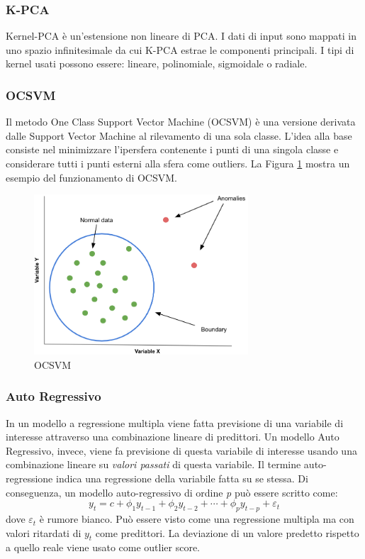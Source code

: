 \subsubsection{K-PCA}
Kernel-PCA \cite{hoffmann2007kernel} è un'estensione non lineare di PCA. I dati di input sono mappati in uno spazio infinitesimale da cui K-PCA estrae le componenti principali. I tipi di kernel usati possono essere: lineare, polinomiale, sigmoidale o radiale.

\subsubsection{OCSVM}
Il metodo One Class Support Vector Machine (OCSVM) \cite{scholkopf2001estimating} è una versione derivata dalle Support Vector Machine al rilevamento di una sola classe. L'idea alla base consiste nel minimizzare l'ipersfera contenente i punti di una singola classe e considerare tutti i punti esterni alla sfera come outliers.
La Figura \ref{ocsvm} mostra un esempio del funzionamento di OCSVM.
\begin{figure}[t]
	\centering
	\includegraphics[width=8cm, scale=1]{images/ocsvm}
	\caption{OCSVM}
	\label{ocsvm}
\end{figure}


\subsubsection{Auto Regressivo}
In un modello a regressione multipla viene fatta previsione di una variabile di interesse attraverso una combinazione lineare di predittori. Un modello Auto Regressivo, invece, viene fa previsione di questa variabile di interesse usando una combinazione lineare su \textit{valori passati} di questa variabile. Il termine auto-regressione indica una regressione della variabile fatta su se stessa.
Di conseguenza, un modello auto-regressivo di ordine \textit{p} può essere scritto come:
\[y_t=c+\phi_1 y_{t-1}+\phi_2 y_{t-2}+\cdots+\phi_p y_{t-p}+\varepsilon_t\]
dove $\varepsilon_t$ è rumore bianco. Può essere visto come una regressione multipla ma con valori ritardati di $y_t$ come predittori. 
La deviazione di un valore predetto rispetto a quello reale viene usato come outlier score.

